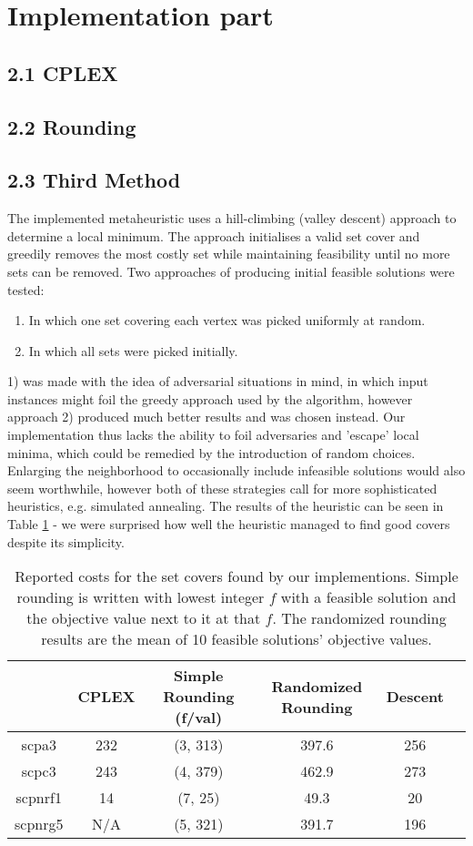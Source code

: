 \documentclass[12pt]{article}
\begin{document}
\pagebreak
\section*{Implementation part}
\subsection*{2.1 CPLEX}

\subsection*{2.2 Rounding}

\subsection*{2.3 Third Method}
The implemented metaheuristic uses a hill-climbing (valley descent) approach to determine a local minimum. The approach initialises a valid set cover and greedily removes the most costly set while maintaining feasibility until no more sets can be removed. Two approaches of producing initial feasible solutions were tested:
\begin{enumerate}
\item In which one set covering each vertex was picked uniformly at random.
\item In which all sets were picked initially.
\end{enumerate}
1) was made with the idea of adversarial situations in mind, in which input instances might foil the greedy approach used by the algorithm, however approach 2) produced much better results and was chosen instead. Our implementation thus lacks the ability to foil adversaries and 'escape' local minima, which could be remedied by the introduction of random choices. Enlarging the neighborhood to occasionally include infeasible solutions would also seem worthwhile, however both of these strategies call for more sophisticated heuristics, e.g. simulated annealing. The results of the heuristic can be seen in Table \ref{times} - we were surprised how well the heuristic managed to find good covers despite its simplicity.
\begin{table}[!hbt]
\center
\begin{tabular}{|c | c | c | c | c | c |}
\hline
& \multicolumn{1}{|c|}{CPLEX} & \multicolumn{1}{|c|}{Simple Rounding (f/val)} & Randomized Rounding & \multicolumn{1}{|c|}{Descent} \\
\hline
scpa3 & 232 & (3, 313) & 397.6 & 256 \\
\hline
scpc3 & 243 & (4, 379) & 462.9 & 273 \\
\hline
scpnrf1 & 14 & (7, 25) & 49.3 & 20 \\
\hline
scpnrg5 & N/A & (5, 321) & 391.7 & 196 \\
\hline 
\end{tabular}
\caption{Reported costs for the set covers found by our implementions. Simple rounding is written with lowest integer $f$ with a feasible solution and the objective value next to it at that $f$. The randomized rounding results are the mean of 10 feasible solutions' objective values.
\label{times}}
\end{table}
\end{document}
